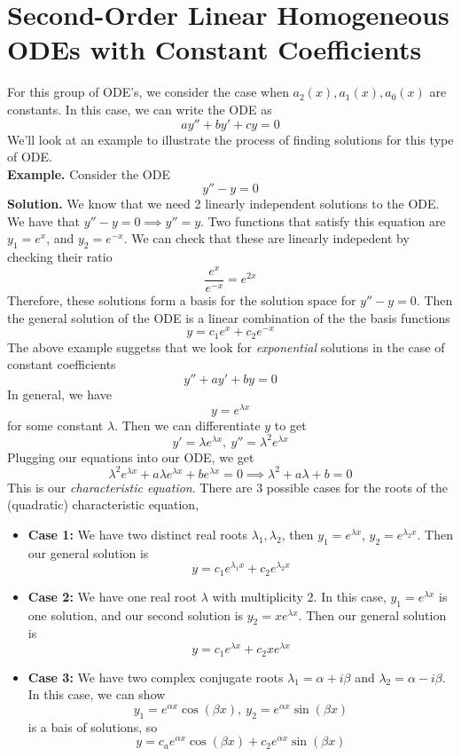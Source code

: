 \documentclass[openany]{report}
\begin{document}
\section{Second-Order Linear Homogeneous ODEs with Constant Coefficients}
For this group of ODE's, we consider the case when $a_2(x), a_1(x), a_0(x)$ are constants. In this case, we can write the ODE as
\[ay'' + by' + cy = 0\]
We'll look at an example to illustrate the process of finding solutions for this type of ODE.\\[3ex]
\textbf{Example.} Consider the ODE 
\[y'' - y = 0\]
\textbf{Solution.} We know that we need 2 linearly independent solutions to the ODE. We have that $y'' - y = 0 \implies y'' = y$. Two functions that satisfy this equation are $y_{1} = e^x$, and $y_2 = e^{-x}$. We can check that these are linearly indepedent by checking their ratio 
\[\frac{e^x}{e^{-x}} = e^{2x}\]
Therefore, these solutions form a basis for the solution space for $y'' - y = 0$. Then the general solution of the ODE is a linear combination of the the basis functions 
\[y = c_1e^x + c_2e^{-x}\]
The above example suggetss that we look for \emph{exponential} solutions in the case of constant coefficients
\[y'' + ay' + by = 0\]
In general, we have
\[y = e^{\lambda x}\]
for some constant $\lambda$. Then we can differentiate $y$ to get 
\[y' = \lambda e^{\lambda x}, \ y'' = \lambda^2 e^{\lambda x}\]
Plugging our equations into our ODE, we get
\[\lambda^2 e^{\lambda x} + a\lambda e^{\lambda x} + b e^{\lambda x} = 0 \implies \lambda^2 + a \lambda + b = 0\]
This is our \emph{characteristic equation}. There are 3 possible cases for the roots of the (quadratic) characteristic equation,
\begin{itemize}
    \item \textbf{Case 1:} We have two distinct real roots $\lambda_1, \lambda_2$, then $y_1 = e^{\lambda x}$, $y_2 = e^{\lambda_2x}$. Then our general solution is 
    \[y = c_1 e^{\lambda_1 x} + c_2 e^{\lambda_2 x}\]
    \item \textbf{Case 2:} We have one real root $\lambda$ with multiplicity 2. In this case, $y_1 = e^{\lambda x}$ is one solution, and our second solution is $y_2 = xe^{\lambda x}$. Then our general solution is
    \[y = c_1e^{\lambda x} + c_2 x e^{\lambda x}\]
    \item \textbf{Case 3:} We have two complex conjugate roots $\lambda_1 = \alpha + i\beta$ and $\lambda_2 = \alpha - i\beta$. In this case, we can show 
    \[y_1 = e^{\alpha x}\cos(\beta x), \ y_2 = e^{\alpha x}\sin(\beta x)\]
    is a bais of solutions, so 
    \[y = c_a e^{\alpha x} \cos (\beta x)  + c_2 e^{\alpha x}\sin(\beta x)\]
\end{itemize}
\end{document}
